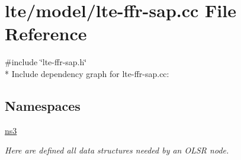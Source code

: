 \hypertarget{lte-ffr-sap_8cc}{}\section{lte/model/lte-\/ffr-\/sap.cc File Reference}
\label{lte-ffr-sap_8cc}
{\ttfamily \#include \char`\"{}lte-\/ffr-\/sap.\+h\char`\"{}}\\*
Include dependency graph for lte-\/ffr-\/sap.cc\+:
\subsection*{Namespaces}
\begin{DoxyCompactItemize}
\item 
 \hyperlink{namespacens3}{ns3}
\begin{DoxyCompactList}\small\item\em Here are defined all data structures needed by an O\+L\+SR node. \end{DoxyCompactList}\end{DoxyCompactItemize}
